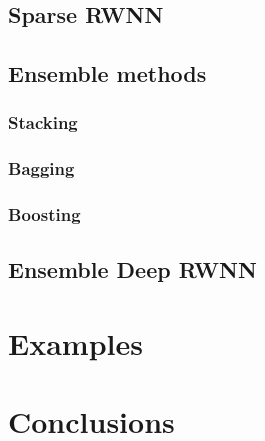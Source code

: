 \documentclass[
]{jss}
\begin{document}
\hypertarget{sparse-rwnn}{%
\subsection{Sparse RWNN}\label{sparse-rwnn}}

\hypertarget{ensemble-methods}{%
\subsection{Ensemble methods}\label{ensemble-methods}}

\hypertarget{stacking}{%
\subsubsection{Stacking}\label{stacking}}

\hypertarget{bagging}{%
\subsubsection{Bagging}\label{bagging}}

\hypertarget{boosting}{%
\subsubsection{Boosting}\label{boosting}}

\hypertarget{ensemble-deep-rwnn}{%
\subsection{Ensemble Deep RWNN}\label{ensemble-deep-rwnn}}

\hypertarget{EX}{%
\section{Examples}\label{EX}}

\hypertarget{CON}{%
\section{Conclusions}\label{CON}}

\renewcommand\refname{References}

\end{document}
